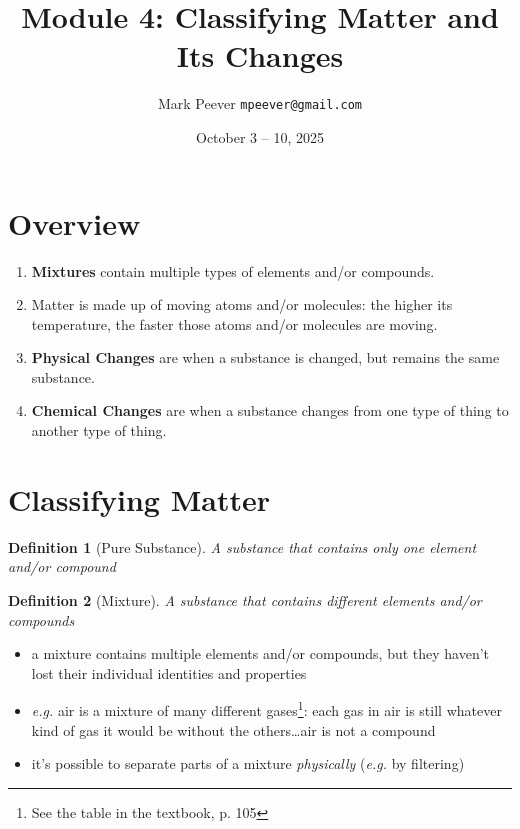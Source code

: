 \documentclass[11pt, oneside]{article}   	%
\title{Module 4: Classifying Matter and Its Changes }
\author{Mark Peever \texttt{mpeever@gmail.com}}
\date{October 3 -- 10, 2025}
\newtheorem{definition}{Definition}
\begin{document}
\maketitle

\begin{center}

\end{center}

\section{Overview}
\begin{enumerate}
\item \textbf{Mixtures} contain multiple types of elements and/or compounds.
\item Matter is made up of moving atoms and/or molecules: the higher its temperature, the faster those atoms and/or molecules are moving.
\item \textbf{Physical Changes} are when a substance is changed, but remains the same substance.
\item \textbf{Chemical Changes} are when a substance changes from one type of thing to another type of thing.
\end{enumerate}

\section{Classifying Matter}

\begin{definition}[Pure Substance]\label{defn:pure-substance}
A substance that contains only one element and/or compound
\end{definition}

\begin{definition}[Mixture]\label{defn:mixture}
A substance that contains different elements and/or compounds
\end{definition}

\begin{itemize}
\item a mixture contains multiple elements and/or compounds, but they haven't lost their individual identities and properties
\item \emph{e.g.} air is a mixture of many different gases\footnote{See the table in the textbook, p. 105}: each gas in air is still whatever kind of gas it would be without the others\ldots air is not a compound
\item it's possible to separate parts of a mixture \emph{physically} (\emph{e.g.} by filtering)
\end{itemize}
\end{document}
